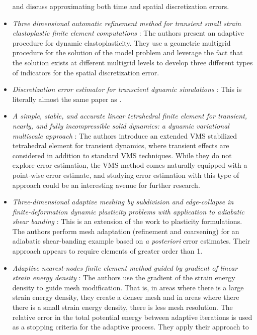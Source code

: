 \documentclass{article}
\begin{document}
\begin{itemize}
and discuss approximating both time and spatial discretization errors.
\item
\emph{Three dimensional automatic refinement method for transient small
strain elastoplastic finite element computations} \cite{biotteau2012three}:
The authors present an adaptive procedure for dynamic elastoplasticity.
They use a geometric multigrid procedure for the solution of the
model problem and leverage the fact that the solution exists at different
multigrid levels to develop three different types of indicators
for the spatial discretization error.
\item
\emph{Discretization error estimator for transcient dynamic simulations}
\cite{combe2002discretization}: This is literally almost the same
paper as \cite{ladeveze2003estimation}.
\item
\emph{A simple, stable, and accurate linear tetrahedral finite element for
transient, nearly, and fully incompressible solid dynamics: a dynamic
variational multiscale approach} \cite{scovazzi2016simple}: The
authors introduce an extended VMS stabilized tetrahedral element for
transient dynamics, where transient effects are considered in addition
to standard VMS techniques. While they do not explore error estimation,
the VMS method comes naturally equipped with a point-wise error estimate,
and studying error estimation with this type of approach could be
an interesting avenue for further research.
\item
\emph{Three-dimensional adaptive meshing by subdivision and edge-collapse in
finite-deformation dynamic plasticity problems with application to adiabatic
shear banding} \cite{molinari2002three}: This is an extension of the work
\cite{radovitzky1999error} to plasticity formulations. The authors perform
mesh adaptation (refinement and coarsening) for an adiabatic shear-banding
example based on \emph{a posteriori} error estimates. Their approach
appears to require elements of greater order than 1.
\item
\emph{Adaptive nearest-nodes finite element method guided by gradient of
linear strain energy density} \cite{luo2009adaptive}: The authors use
the gradient of the strain energy density to guide mesh modification.
That is, in areas where there is a large strain energy density, they
create a denser mesh and in areas where there there is a small strain
energy density, there is less mesh resolution. The relative error in the
total potential energy between adaptive iterations is used as a stopping
criteria for the adaptive process. They apply their approach to

\end{itemize}
\end{document}
